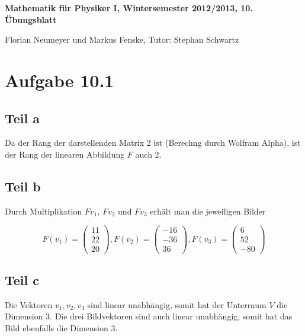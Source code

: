 \documentclass[a4paper,german,12pt,smallheadings]{scrartcl}
\begin{document}
\begin{center}
\bfseries %
\sffamily %
\vspace{-40pt}
Mathematik für Physiker I, Wintersemester 2012/2013, 10. Übungsblatt

Florian Neumeyer und Markus Fenske, Tutor: Stephan Schwartz
\vspace{-10pt}
\end{center}

\section*{Aufgabe 10.1}
\subsection*{Teil a}

Da der Rang der darstellenden Matrix 2 ist (Berechng durch Wolfram Alpha), ist
der Rang der linearen Abbildung $F$ auch 2.

\subsection*{Teil b}

Durch Multiplikation $Fv_1$, $Fv_2$ und $Fv_3$ erhält man die jeweiligen Bilder

\begin{equation}
  F(v_1) = \begin{pmatrix} 11 \\ 22 \\ 20 \end{pmatrix}, 
  F(v_2) = \begin{pmatrix} -16 \\ -36 \\ 36 \end{pmatrix},
  F(v_3) = \begin{pmatrix} 6 \\ 52 \\ -80 \end{pmatrix}
\end{equation}

\subsection*{Teil c}

Die Vektoren $v_1, v_2, v_3$ sind linear unabhängig, somit hat der Unterraum
$V$ die Dimension 3.  Die drei Bildvektoren sind auch linear unabhängig, somit hat das
Bild ebenfalls die Dimension 3.
\end{document}
